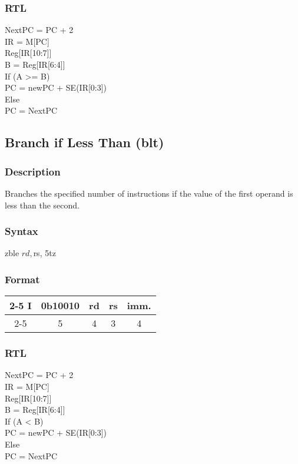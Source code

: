 \documentclass[12pt, a4paper]{report}
\begin{document}
	\subsubsection{RTL}
	NextPC = PC + 2 \\
	IR = M[PC] \\
	Reg[IR[10:7]] \\
	B = Reg[IR[6:4]] \\
	If (A  >=  B) \\
	PC = newPC + SE(IR[0:3]) \\
	Else \\
	PC = NextPC \\
	
	\subsection{Branch if Less Than (blt)}
	\subsubsection{Description}
	Branches the specified number of instructions if the value of the first operand is less than the second.
	\subsubsection{Syntax}
	zble    $rd, $rs, 5tz %
	\subsubsection{Format}
	\begin{center}
		{\renewcommand{\arraystretch}{1.5}
			\begin{tabular}[b]{c @{ } c | c | c | c|}
				\cline{2-5}
				I & \vline \hspace{1.5pt} 0b10010 & rd & rs & imm. \\
				\cline{2-5}
				\multicolumn{1}{}{} & \multicolumn{1}{c}{5} & \multicolumn{1}{c}{4}
				& \multicolumn{1}{c}{3} & \multicolumn{1}{c}{4}
			\end{tabular}}
	\end{center}
	\subsubsection{RTL}
	NextPC = PC + 2 \\
	IR = M[PC] \\
	Reg[IR[10:7]] \\
	B = Reg[IR[6:4]] \\
	If (A  <  B) \\
	PC = newPC + SE(IR[0:3]) \\
	Else \\
	PC = NextPC \\
	
\end{document}
